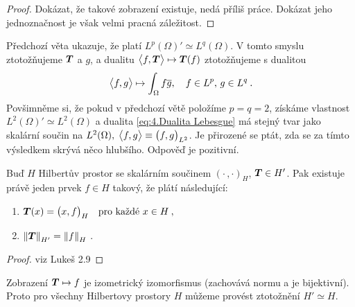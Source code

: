 \begin{proof}
Dokázat, že takové zobrazení existuje, nedá příliš práce. Dokázat jeho jednoznačnost je však velmi pracná záležitost.
\end{proof}

Předchozí věta ukazuje, že platí $L^p(\Omega)' \simeq L^q(\Omega)$. V tomto smyslu ztotožňujeme $\boldsymbol{T}$ a $g$, a dualitu $\big< f, \boldsymbol{T} \big> \mapsto \boldsymbol{T}(f)$ ztotožňujeme s dualitou
\begin{equation}
    \big< f, g \big> \mapsto \int_\Omega f \overline{g}, \quad f \in L^p, \, g \in L^q \: .
    \label{eq:4.Dualita Lebesgue}
\end{equation}
Povšimněme si, že pokud v předchozí větě položíme $p=q=2$, získáme vlastnost $L^2(\Omega)' \simeq L^2(\Omega)$ a dualita \eqref{eq:4.Dualita Lebesgue} má stejný tvar jako skalární součin na $L^2(\Omega), \; \big< f, g \big> \equiv \big( f, g \big)_{L^2}$. Je přirozené se ptát, zda se za tímto výsledkem skrývá něco hlubšího. Odpověď je pozitivní.

\begin{theorem} \label{4.Riesz-Frechet}
Buď $H$ Hilbertův prostor se skalárním součinem $(\cdot \, , \cdot)_H$, $\boldsymbol{T} \in H'$.
Pak existuje právě jeden prvek $f \in H $ takový, že plátí následující:
\begin{enumerate}
    \item $\boldsymbol{T}(x) = \big( x, f \big)_H \quad \text{pro každé } x \in H \:, $
    \item $\left\lVert\boldsymbol{T}\right\rVert_{H'} = \left\lVert f\right\rVert_H \:.$
\end{enumerate}
\end{theorem}
\begin{proof}
viz Lukeš 2.9
\end{proof}

\begin{corollary}
Zobrazení $\boldsymbol{T} \mapsto f$ je izometrický izomorfismus (zachovává normu a je bijektivní). Proto pro všechny Hilbertovy prostory $H$ můžeme provést ztotožnění $H' \simeq H$.
\end{corollary}



